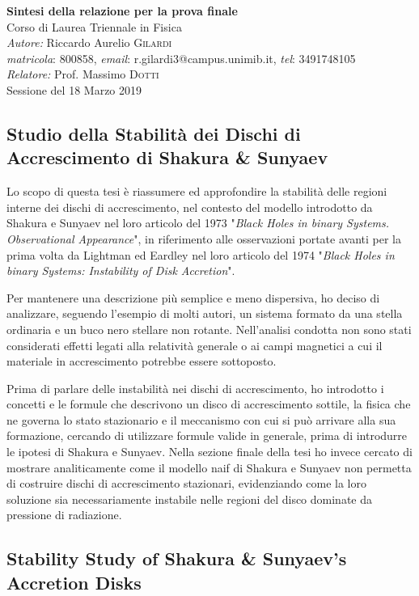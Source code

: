 \documentclass[a4paper]{article}
\begin{document}
\textbf{{\Large Sintesi della relazione per la prova finale}}\\
\bigskip
{Corso di Laurea Triennale in Fisica}\\
\emph{Autore:} Riccardo Aurelio \textsc{Gilardi}\\
\bigskip
\textit{matricola}: 800858, \textit{email}: r.gilardi3@campus.unimib.it, \textit{tel}: 3491748105\\
\bigskip
\emph{Relatore:} Prof. Massimo \textsc{Dotti}\\
Sessione del 18 Marzo 2019

\subsection*{Studio della Stabilità dei Dischi di Accrescimento di Shakura \& Sunyaev}
Lo scopo di questa tesi è riassumere ed approfondire la stabilità delle regioni interne dei dischi di accrescimento, nel contesto del modello introdotto da Shakura e Sunyaev nel loro articolo del 1973 "\textit{Black Holes in binary Systems. Observational Appearance}", in riferimento alle osservazioni portate avanti per la prima volta da Lightman ed Eardley nel loro articolo del 1974 "\textit{Black Holes in binary Systems: Instability of Disk Accretion}".

Per mantenere una descrizione più semplice e meno dispersiva, ho deciso di analizzare, seguendo l'esempio di molti autori, un sistema formato da una stella ordinaria e un buco nero stellare non rotante.
Nell'analisi condotta non sono stati considerati effetti legati alla relatività generale o ai campi magnetici a cui il materiale in accrescimento potrebbe essere sottoposto.

Prima di parlare delle instabilità nei dischi di accrescimento, ho introdotto i concetti e le formule che descrivono un disco di accrescimento sottile, la fisica che ne governa lo stato stazionario e il meccanismo con cui si può arrivare alla sua formazione, cercando di utilizzare formule valide in generale, prima di introdurre le ipotesi di Shakura e Sunyaev.
Nella sezione finale della tesi ho invece cercato di mostrare analiticamente come il modello naif di Shakura e Sunyaev non permetta di costruire dischi di accrescimento stazionari, evidenziando come la loro soluzione sia necessariamente instabile nelle regioni del disco dominate da pressione di radiazione.

\subsection*{Stability Study of Shakura \& Sunyaev's Accretion Disks}
\end{document}
